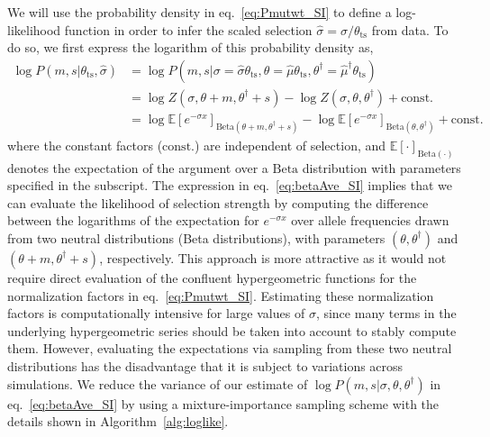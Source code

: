 \documentclass[11pt]{article}
\newcommand{\ts}{{\text{ts}}}
\newcommand{\E}{{\mathbb{E}}}
\begin{document}
We will use the probability density in eq.~\ref{eq:Pmutwt_SI} to define a  log-likelihood function in order to infer the scaled selection $\hat{\sigma}=\sigma/\theta_\ts $ from data.  To do so, we first express the logarithm of this probability density  as, 
\begin{align}
\nonumber \log P(m,s | \theta_{\ts}, \hat{\sigma}) & = \log P(m,s | \sigma = \hat{\sigma} \theta_{\ts} , \theta = \hat{\mu} \theta_{\ts}, \theta^\dagger = \hat{\mu}^\dagger \theta_{\ts}) \\
\nonumber &= \log Z(\sigma,\theta+ m,\theta^\dagger +s) - \log Z(\sigma,\theta,\theta^\dagger) + \text{const.}\\
\label{eq:betaAve_SI}&=\log \E\left[ e^{- \sigma x}\right]_{ \text{Beta}(\theta +  m, \theta^\dagger + s)}-  \log \E\left[e^{- \sigma x} \right]_{\text{Beta}(\theta, \theta^\dagger)} +\text{const.} 
\end{align}
where the constant factors ($\text{const.}$) are independent of selection,  and $\E[\cdot]_{\text{Beta}(\cdot)}$ denotes the expectation  of the argument over a $\text{Beta}$ distribution with parameters specified in the subscript. The expression in eq.~\ref{eq:betaAve_SI} implies that we can evaluate the likelihood of selection strength by computing the difference  between the logarithms of the expectation for $e^{-\sigma x}$ over allele frequencies drawn from two neutral distributions (Beta distributions), with parameters $(\theta,\theta^\dagger)$ and  $(\theta+m,\theta^\dagger+s)$, respectively. This approach is  more attractive as it would not require direct evaluation of the confluent hypergeometric functions for the normalization factors in eq.~\ref{eq:Pmutwt_SI}. Estimating these normalization factors is computationally intensive for large values of  $\sigma$, since many terms in the underlying hypergeometric series should be taken into account to stably compute them. However, evaluating the expectations via sampling  from these two neutral distributions  has the disadvantage that it is subject to  variations across simulations. We reduce the variance of our estimate of $\log P(m,s|\sigma,\theta,\theta^\dagger) $ in eq.~\ref{eq:betaAve_SI} by using a mixture-importance sampling scheme \cite{owenSafeEffectiveImportance2000} with the details shown in Algorithm~\ref{alg:loglike}.
\end{document}
